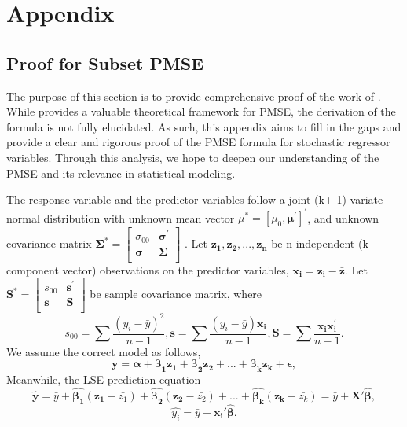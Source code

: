 \chapter{Appendix}

\section{Proof for Subset PMSE}
The purpose of this section is to provide comprehensive proof of the work of \cite{narula1974predictive}. While \cite{narula1974predictive} provides a valuable theoretical framework for PMSE, the derivation of the formula is not fully elucidated. As such, this appendix aims to fill in the gaps and provide a clear and rigorous proof of the PMSE formula for stochastic regressor variables. Through this analysis, we hope to deepen our understanding of the PMSE and its relevance in statistical modeling.

The response variable and the predictor variables follow a joint
 (k+ 1)-variate normal distribution with unknown mean vector $\mu^{*}=[\mu_{0},\boldsymbol{\mu^{'}}]^{'}$, and unknown covariance matrix 
$ \boldsymbol{\Sigma^{*}}  =    
 \begin{bmatrix} 
    \sigma_{00} & \boldsymbol{\sigma^{'}} \\  
    \boldsymbol{\sigma} & \boldsymbol{\Sigma} \\  
\end{bmatrix}$ . Let $\boldsymbol {z_1, z_2,..., z_n}$ be n independent (k-component vector) observations on the predictor variables, $\boldsymbol{x_i=z_i-\bar{z}}$. Let $ \boldsymbol{S^{*}}  =    
 \begin{bmatrix} 
    s_{00} & \boldsymbol{s^{'}} \\  
    \boldsymbol{s} & \boldsymbol{S} \\  
\end{bmatrix}$ be sample covariance matrix, where 
$$s_{00}=\sum{\frac{(y_i-\bar{y})^2}{n-1}},\boldsymbol{s}=\sum{\frac{(y_i-\bar{y})\boldsymbol{x_i}}{n-1}}, \boldsymbol{S}=\sum{\frac{\boldsymbol{x_{i}x_{i}^{'}}}{n-1}}.
$$
We assume the correct model as follows,
$$\boldsymbol{y=\alpha+ \beta_1z_1+\beta_2z_2+...+\beta_kz_k+\epsilon},$$
Meanwhile, the LSE prediction equation 
$$
\boldsymbol{\hat{y}}=\bar{y}+\boldsymbol{\hat{\beta_1}}(\boldsymbol{z_1}-\bar{z_1})+\boldsymbol{\hat{\beta_2}}(\boldsymbol{z_2}-\bar{z_2})+...+\boldsymbol{\hat{\beta_k}}(\boldsymbol{z_k}-\bar{z_k})=\bar{y}+\boldsymbol{X'\hat{\beta}},$$
$$\hat{y_i}=\bar{y}+\boldsymbol{x_{i}'\hat{\beta}}.
$$

